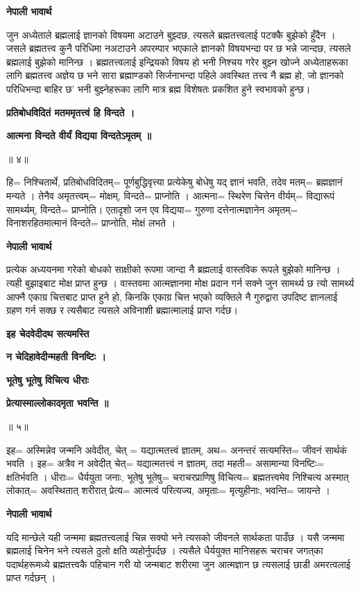 \documentclass[11pt, a5paper]{article}
\begin{document}
\textbf{नेपाली भावार्थ}

जुन अध्येताले ब्रह्मलाई ज्ञानको विषयमा अटाउने बुझ्दछ, त्यसले ब्रह्मतत्त्वलाई पटक्कै बुझेको हुँदैन । जसले ब्रह्मतत्त्व कुनै परिधिमा नअटाउने अपरम्पार भएकाले ज्ञानको विषयभन्दा पर छ भन्ने जान्दछ, त्यसले ब्रह्मलाई बुझेको मानिन्छ । ब्रह्मतत्त्वलाई इन्द्रियको विषय हो भनी निश्चय गरेर बुझ्न खोज्ने अध्येताहरूका लागि ब्रह्मतत्त्व अज्ञेय छ भने सारा ब्रह्माण्डको सिर्जनाभन्दा पहिले अवस्थित तत्त्व नै ब्रह्म हो, जो ज्ञानको परिधिभन्दा बाहिर छ’ भनी बुझ्नेहरूका लागि मात्र ब्रह्म विशेषतः प्रकशित हुने स्वभावको हुन्छ।

\textbf{प्रतिबोधविदितं मतममृतत्त्वं हि विन्दते ।}

\textbf{आत्मना विन्दते वीर्यं विद्यया विन्दतेऽमृतम् ॥}

॥ ४॥

हि= निश्चितार्थे, प्रतिबोधविदितम्= पूर्णबुद्धिवृत्त्या प्रत्येकेषु बोधेषु यद् ज्ञानं भवति, तदेव मतम्= ब्रह्मज्ञानं मन्यते । तेनैव अमृतत्त्वम्= मोक्षम्, विन्दते= प्राप्नोति । आत्मना= स्थिरेण चित्तेन  वीर्यम्= विद्यारूपं सामर्थ्यम्, विन्दते= प्राप्नोति। एतादृशो जन एव विद्यया= गुरुणा दत्तेनात्मज्ञानेन अमृतम्= विनाशरहितमात्मानं विन्दते= प्राप्नोति, मोक्षं लभते ।

\textbf{नेपाली भावार्थ}

प्रत्येक अध्ययनमा गरेको बोधको साक्षीको रूपमा जान्दा नै ब्रह्मलाई वास्तविक रूपले बुझेको मानिन्छ । त्यही बुझाइबाट मोक्ष प्राप्त हुन्छ । वास्तवमा आत्मज्ञानमा मोक्ष प्रदान गर्न सक्ने जुन सामर्थ्य छ त्यो सामर्थ्य आफ्नै एकाग्र चित्तबाट प्राप्त हुने हो, किनकि एकाग्र चित्त भएको व्यक्तिले नै गुरुद्वारा उपदिष्ट ज्ञानलाई ग्रहण गर्न सक्छ र त्यसैबाट त्यसले अविनाशी ब्रह्मात्मालाई प्राप्त गर्दछ।

\textbf{इह चेदवेदीदथ सत्यमस्ति}

\textbf{न चेदिहावेदीन्महती विनष्टिः ।}

\textbf{भूतेषु भूतेषु विचित्य धीराः}

\textbf{प्रेत्यास्माल्लोकादमृता भवन्ति ॥}

॥ ५॥

इह= अस्मिन्नेव जन्मनि अवेदीत्, चेत् = यद्यात्मतत्त्वं ज्ञातम्, अथ= अनन्तरं सत्यमस्ति= जीवनं सार्थकं भवति । इह= अत्रैव न अवेदीत् चेत्= यद्यात्मतत्त्वं न ज्ञातम्, तदा महती= असामान्या विनष्टिः= क्षतिर्भवति । धीराः= धैर्ययुता जनाः, भूतेषु भूतेषु= चराचरप्राणिषु विचित्य= ब्रह्मतत्त्वमेव निश्चित्य अस्मात् लोकात्= अवस्थितात् शरीरात् प्रेत्य= आत्मत्वं परित्यज्य, अमृताः= मृत्युहीनाः, भवन्ति= जायन्ते ।

\textbf{नेपाली भावार्थ}

यदि मान्छेले यही जन्ममा ब्रह्मतत्त्वलाई चिन्न सक्यो भने त्यसको जीवनले सार्थकता पाउँछ । यसै जन्ममा ब्रह्मलाई चिनेन भने त्यसले ठुलो क्षति व्यहोर्नुपर्दछ । त्यसैले धैर्ययुक्त मानिसहरू चराचर जगत्‌का पदार्थहरूमध्ये ब्रह्मतत्त्वकै पहिचान गरी यो जन्मबाट शरीरमा जुन आत्मज्ञान छ त्यसलाई छाडी अमरत्वलाई प्राप्त गर्दछन् ।
\end{document}
